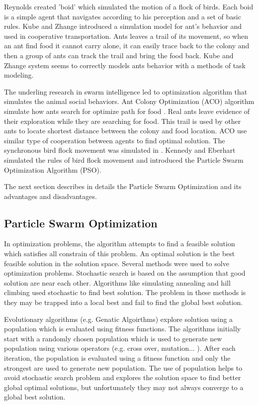 Reynolds \cite{swarmflock} created 'boid' which simulated the motion of a flock of birds. Each boid is a simple agent that navigates according to his perception and a set of basic rules.  Kube and Zhange \cite{antsimulation} introduced a simulation model for ant's behavior and used in cooperative transportation. Ants leaves a trail of its movement, so when an ant find food it cannot carry alone, it can easily trace back to the colony and then a group of ants can track the trail and bring the food back. Kube and Zhange \cite{antsimulation,swarmGeneral} system seems to correctly models ants behavior with a methods of task modeling. 

The underling research in swarm intelligence led to optimization algorithm that simulates the animal social behaviors. Ant Colony Optimization (ACO) algorithm simulate how ants search for optimize path for food \cite{ACOFirst}. Real ants leave evidence of their exploration while they are searching for food. This trail is used by other ants to locate shortest distance between the colony and food location. ACO use similar type of cooperation between agents to find optimal solution.  The synchronous bird flock movement was simulated in \cite{PSOFirst,PSO2}.  Kennedy and Eberhart \cite{PSOFirst,PSO2} simulated the rules of bird flock movement and introduced the Particle Swarm Optimization Algorithm (PSO).

   The next section describes in details the Particle Swarm Optimization and its advantages and disadvantages. 
 \subsection{Particle Swarm Optimization}
 In optimization problems, the algorithm attempts to find a feasible solution which satisfies all constrain of this problem. An optimal solution is the best feasible solution in the solution space. Several methods were used to solve optimization problems. Stochastic search is based on the assumption that good solution are near each other. Algorithms like simulating annealing and hill climbing used stochastic to find best solution. The problem in these methods is they may be trapped into a local best and fail to find the global best solution.
 
  Evolutionary algorithms (e.g. Genatic Algoirthms) explore solution using a population which is evaluated using fitness functions. The algorithms initially start with a randomly chosen population which is used to generate new population using various operators (e.g. cross over, mutation... ).  After each iteration, the population is evaluated using a fitness function and only the strongest are used to generate new population. The use of population helps to avoid stochastic search problem and explores the solution space to find better global optimal solutions, but unfortunately they may not always converge to a global best solution\cite{PSOpattern}. 
 
